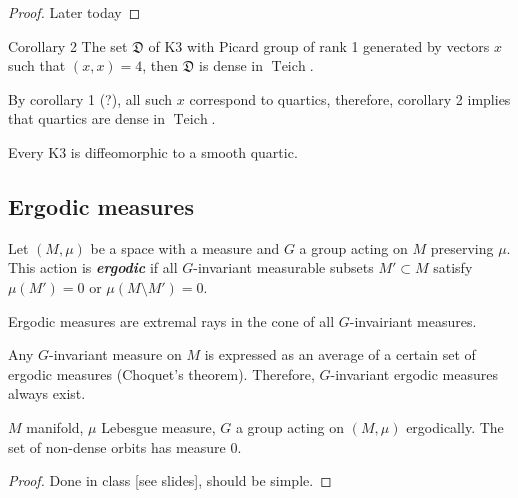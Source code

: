 \begin{proof}\leavevmode
	Later today
\end{proof}

\begin{idea4}{Corollary 2}\leavevmode
	The set $\mathfrak{D}$ of K3 with Picard group of rank 1 generated by vectors $x$ such that  $(x,x)=4$, then $\mathfrak{D}$ is dense in $\operatorname{Teich}$.
\end{idea4}

\begin{remark}\leavevmode
	By corollary 1 (?), all such $x$ correspond to quartics, therefore, corollary 2 implies that quartics are dense in $\operatorname{Teich}$.
\end{remark}

\begin{coro}\leavevmode
	Every K3 is diffeomorphic to a smooth quartic.
\end{coro}

\subsection{Ergodic measures}

\begin{defn}\leavevmode
	Let $(M,\mu)$ be a space with a measure and $G$ a group acting on $M$ preserving $\mu$. This action is \textit{\textbf{ergodic}} if all $G$-invariant measurable subsets $M' \subset M $ satisfy $\mu(M')=0$ or $\mu(M\setminus M')=0$.
\end{defn}

\begin{remark}\leavevmode
	Ergodic measures are extremal rays in the cone of all $G$-invairiant measures.
\end{remark}

\begin{remark}\leavevmode
	Any $G$-invariant measure on $M$ is expressed as an average of a certain set of ergodic measures (Choquet's theorem). Therefore, $G$-invariant ergodic measures always exist.
\end{remark}

\begin{claim}\leavevmode
	$M$ manifold, $\mu$ Lebesgue measure, $G$ a group acting on $(M,\mu)$ ergodically. The set of non-dense orbits has measure 0.
\end{claim}

\begin{proof}\leavevmode
	Done in class [see slides], should be simple.
\end{proof}

